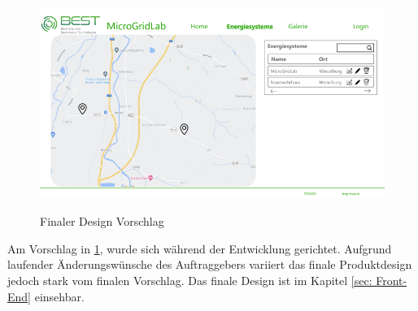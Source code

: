 \begin{figure}[h]
	\centering
	\includegraphics[height=7cm,width=12cm]{images/FinalerVorschlag}
	\caption{Finaler Design Vorschlag}
	\label{fig:Finaler Design Vorschlag}
\end{figure}
\newpage
Am Vorschlag in \ref{fig:Finaler Design Vorschlag}, wurde sich während der Entwicklung gerichtet. Aufgrund laufender Änderungswünsche des Auftraggebers variiert das finale Produktdesign jedoch stark vom finalen Vorschlag. Das finale Design ist im Kapitel \ref{sec: Front-End} einsehbar. 

